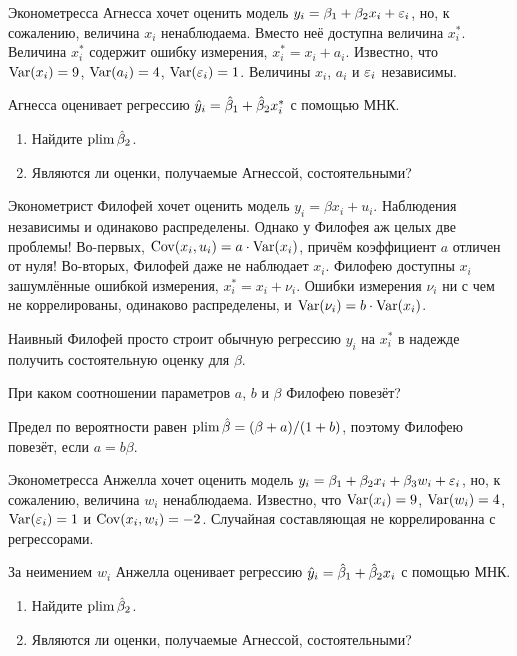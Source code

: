 \begin{problem}
Эконометресса Агнесса хочет оценить модель $y_i=\beta_1+\beta_2 x_i +\varepsilon_i$, но, к сожалению, величина $x_i$ ненаблюдаема. Вместо неё доступна величина  $x_i^*$. Величина $x_i^*$  содержит ошибку измерения, $x_i^*=x_i+a_i$. Известно, что $\operatorname{Var}(x_i)=9$, $\operatorname{Var}(a_i)=4$,   $\operatorname{Var}(\varepsilon_i)=1$. Величины $x_i$, $a_i$ и $\varepsilon_i$ независимы.

Агнесса оценивает регрессию $\hat{y}_i=\hat{\beta}_1+\hat{\beta}_2 x_i^*$ с помощью МНК.
\begin{enumerate}
\item Найдите $\operatorname*{plim} \hat{\beta}_2$.
\item Являются ли оценки, получаемые Агнессой, состоятельными?
\end{enumerate}


\begin{sol}
\end{sol}
\end{problem}



\begin{problem}
Эконометрист Филофей хочет оценить модель $y_i = \beta x_i + u_i$.
Наблюдения независимы и одинаково распределены. Однако у Филофея аж целых две проблемы!
Во-первых, $\operatorname{Cov}(x_i, u_i) = a \cdot \operatorname{Var}(x_i)$, причём коэффициент $a$ отличен от нуля!
Во-вторых, Филофей даже не наблюдает $x_i$. Филофею доступны $x_i$ зашумлённые ошибкой измерения,
$x_i^* = x_i + \nu_i$. Ошибки измерения $\nu_i$ ни с чем не коррелированы, одинаково распределены, и
$\operatorname{Var}(\nu_i) = b \cdot \operatorname{Var}(x_i)$.

Наивный Филофей просто строит обычную регрессию $y_i$ на $x_i^*$ в надежде получить
состоятельную оценку для $\beta$.

При каком соотношении параметров $a$, $b$ и $\beta$ Филофею повезёт?
\begin{sol}
Предел по вероятности равен $\operatorname*{plim} \hat{\beta} = (\beta + a)/(1 + b)$, поэтому Филофею повезёт,
если $a = b \beta$. 
\end{sol}
\end{problem}



\begin{problem}
Эконометресса Анжелла хочет оценить модель $y_i=\beta_1+\beta_2 x_i +\beta_3 w_i +\varepsilon_i$, но, к сожалению, величина $w_i$ ненаблюдаема. Известно, что $\operatorname{Var}(x_i)=9$, $\operatorname{Var}(w_i)=4$,  $\operatorname{Var}(\varepsilon_i)=1$ и $\operatorname{Cov}(x_i,w_i)=-2$. Случайная составляющая не коррелированна с регрессорами.

За неимением $w_i$ Анжелла оценивает регрессию $\hat{y}_i=\hat{\beta}_1+\hat{\beta}_2 x_i$ с помощью МНК.
\begin{enumerate}
\item Найдите $\operatorname*{plim} \hat{\beta}_2$.
\item Являются ли оценки, получаемые Агнессой, состоятельными?
\end{enumerate}



\begin{sol}
\end{sol}
\end{problem}




